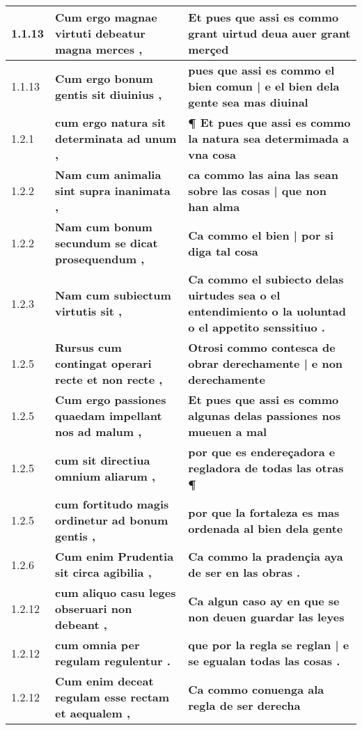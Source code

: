 \begin{tabular}{|p{1cm}|p{6.5cm}|p{6.5cm}|}
1.1.13 &  \textbf{ Cum ergo magnae virtuti debeatur magna merces , }  &  \textbf{ Et pues que assi es commo grant uirtud deua auer grant merçed }  \\\hline
1.1.13 &  \textbf{ Cum ergo bonum gentis sit diuinius , }  &  \textbf{ pues que assi es commo el bien comun | e el bien dela gente sea mas diuinal }  \\\hline
1.2.1 &  \textbf{ cum ergo natura sit determinata ad unum , }  &  \textbf{ ¶ Et pues que assi es commo la natura sea determimada a vna cosa }  \\\hline
1.2.2 &  \textbf{ Nam cum animalia sint supra inanimata , }  &  \textbf{ ca commo las aina las sean sobre las cosas | que non han alma }  \\\hline
1.2.2 &  \textbf{ Nam cum bonum secundum se dicat prosequendum , }  &  \textbf{ Ca commo el bien | por si diga tal cosa }  \\\hline
1.2.3 &  \textbf{ Nam cum subiectum virtutis sit , }  &  \textbf{ Ca commo el subiecto delas uirtudes sea o el entendimiento o la uoluntad o el appetito senssitiuo . }  \\\hline
1.2.5 &  \textbf{ Rursus cum contingat operari recte et non recte , }  &  \textbf{ Otrosi commo contesca de obrar derechamente | e non derechamente }  \\\hline
1.2.5 &  \textbf{ Cum ergo passiones quaedam impellant nos ad malum , }  &  \textbf{ Et pues que assi es commo algunas delas passiones nos mueuen a mal }  \\\hline
1.2.5 &  \textbf{ cum sit directiua omnium aliarum , }  &  \textbf{ por que es endereçadora e regladora de todas las otras ¶ }  \\\hline
1.2.5 &  \textbf{ cum fortitudo magis ordinetur ad bonum gentis , }  &  \textbf{ por que la fortaleza es mas ordenada al bien dela gente }  \\\hline
1.2.6 &  \textbf{ Cum enim Prudentia sit circa agibilia , }  &  \textbf{ Ca commo la pradençia aya de ser en las obras . }  \\\hline
1.2.12 &  \textbf{ cum aliquo casu leges obseruari non debeant , }  &  \textbf{ Ca algun caso ay en que se non deuen guardar las leyes }  \\\hline
1.2.12 &  \textbf{ cum omnia per regulam regulentur . }  &  \textbf{ que por la regla se reglan | e se egualan todas las cosas . }  \\\hline
1.2.12 &  \textbf{ Cum enim deceat regulam esse rectam et aequalem , }  &  \textbf{ Ca commo conuenga ala regla de ser derecha }  \\\hline

\end{tabular}
